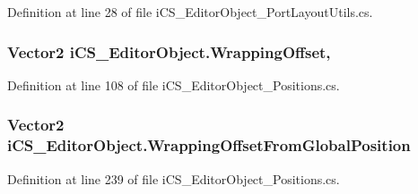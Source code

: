 Definition at line 28 of file i\+C\+S\+\_\+\+Editor\+Object\+\_\+\+Port\+Layout\+Utils.\+cs.

\hypertarget{classi_c_s___editor_object_a3c41c4ee9c5f52d5d91bb3ebeb106fee}{
\subsubsection[{Wrapping\+Offset}]{\setlength{\rightskip}{0pt plus 5cm}Vector2 i\+C\+S\+\_\+\+Editor\+Object.\+Wrapping\+Offset\hspace{0.3cm}{\ttfamily [get]}, {\ttfamily [set]}}}\label{classi_c_s___editor_object_a3c41c4ee9c5f52d5d91bb3ebeb106fee}


Definition at line 108 of file i\+C\+S\+\_\+\+Editor\+Object\+\_\+\+Positions.\+cs.

\hypertarget{classi_c_s___editor_object_a2d5532a596577c9e6ca4161b47bbddef}{
\subsubsection[{Wrapping\+Offset\+From\+Global\+Position}]{\setlength{\rightskip}{0pt plus 5cm}Vector2 i\+C\+S\+\_\+\+Editor\+Object.\+Wrapping\+Offset\+From\+Global\+Position\hspace{0.3cm}{\ttfamily [set]}}}\label{classi_c_s___editor_object_a2d5532a596577c9e6ca4161b47bbddef}


Definition at line 239 of file i\+C\+S\+\_\+\+Editor\+Object\+\_\+\+Positions.\+cs.



